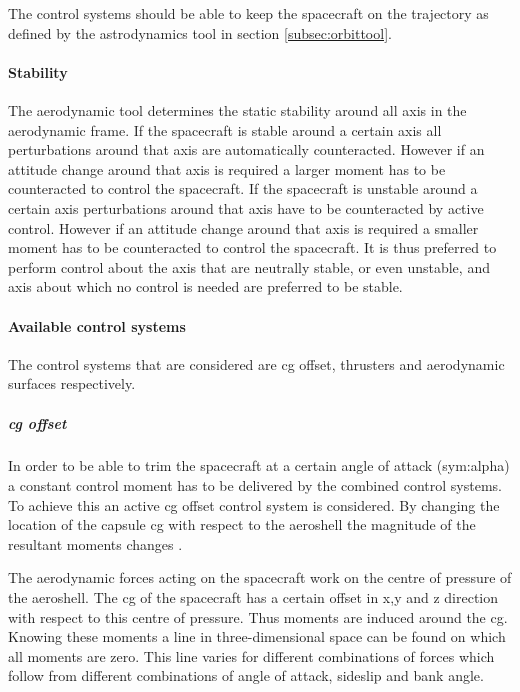 The control systems should be able to keep the spacecraft on the trajectory as defined by the astrodynamics tool in section \ref{subsec:orbittool}.

%

\paragraph{Stability}
\label{control:stab}

The aerodynamic tool determines the static stability around all axis in the aerodynamic frame. If the spacecraft is stable around a certain axis all perturbations around that axis are automatically counteracted. However if an attitude change around that axis is required a larger moment has to be counteracted to control the spacecraft.  If the spacecraft is unstable around a certain axis perturbations around that axis have to be counteracted by active control. However if an attitude change around that axis is required a smaller moment has to be counteracted to control the spacecraft. It is thus preferred to perform control about the axis that are neutrally stable, or even unstable, and axis about which no control is needed are preferred to be stable.

\paragraph{Available control systems}
\label{control:system}

The control systems that are considered are \gls{cg} offset, thrusters and aerodynamic surfaces respectively.

\subparagraph{\acrlong{cg} offset}

In order to be able to trim the spacecraft at a certain angle of attack (\gls{sym:alpha}) a constant control moment has to be delivered by the combined control systems. To achieve this an active \gls{cg} offset control system is considered. By changing the location of the capsule \gls{cg} with respect to the aeroshell the magnitude of the resultant moments changes \cite{Mulqueen1991}. 

The aerodynamic forces acting on the spacecraft work on the centre of pressure of the aeroshell. The \gls{cg} of the spacecraft has a certain offset in x,y and z direction with respect to this centre of pressure. Thus moments are induced around the \gls{cg}. Knowing these moments a line in three-dimensional space can be found on which all moments are zero. This line varies for different combinations of forces which follow from different combinations of angle of attack, sideslip and bank angle.

